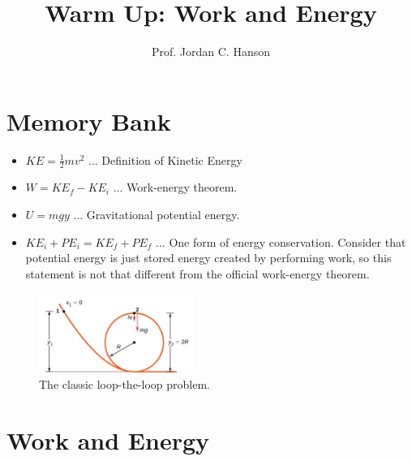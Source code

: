 \documentclass{article}
\begin{document}
\small
\title{Warm Up: Work and Energy}
\author{Prof. Jordan C. Hanson}

\maketitle

\section{Memory Bank}

\begin{itemize}
\item $KE = \frac{1}{2}m v^2$ ... Definition of Kinetic Energy
\item $W = KE_f - KE_i$ ... Work-energy theorem.
\item $U = mgy$ ... Gravitational potential energy.
\item $KE_i + PE_i = KE_f + PE_f$ ... One form of energy conservation.  Consider that potential energy is just stored energy created by performing work, so this statement is not that different from the official work-energy theorem.
\end{itemize}

\begin{figure}
\centering
\includegraphics[width=0.45\textwidth]{figures/loop.png}
\caption{\label{fig:1} The classic loop-the-loop problem.}
\end{figure}

\section{Work and Energy}
\end{document}
